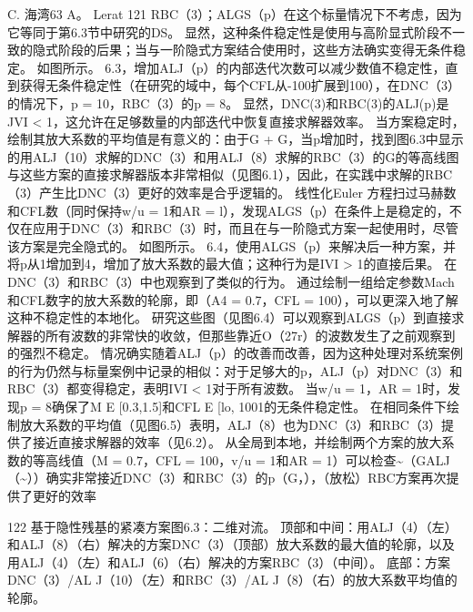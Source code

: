 \documentclass[UTF8,11pt,a4paper,openany,fontset=fandol]{ctexbook}
\begin{document}
C. 海湾63 A。 Lerat 121 RBC（3）；ALGS（p）在这个标量情况下不考虑，因为它等同于第6.3节中研究的DS。 显然，这种条件稳定性是使用与高阶显式阶段不一致的隐式阶段的后果；当与一阶隐式方案结合使用时，这些方法确实变得无条件稳定。 如图所示。 6.3，增加ALJ（p）的内部迭代次数可以减少数值不稳定性，直到获得无条件稳定性（在研究的域中，每个CFL从-100扩展到100），在DNC（3）的情况下，p = 10，RBC（3）的p = 8。 显然，DNC(3)和RBC(3)的ALJ(p)是JVI < 1，这允许在足够数量的内部迭代中恢复直接求解器效率。 当方案稳定时，绘制其放大系数的平均值是有意义的：由于G + G，当p增加时，找到图6.3中显示的用ALJ（10）求解的DNC（3）和用ALJ（8）求解的RBC（3）的G的等高线图与这些方案的直接求解器版本非常相似（见图6.1），因此，在实践中求解的RBC（3）产生比DNC（3）更好的效率是合乎逻辑的。 线性化Euler 方程扫过马赫数和CFL数（同时保持w/u = 1和AR = l），发现ALGS（p）在条件上是稳定的，不仅在应用于DNC（3）和RBC（3）时，而且在与一阶隐式方案一起使用时，尽管该方案是完全隐式的。 如图所示。 6.4，使用ALGS（p）来解决后一种方案，并将p从1增加到4，增加了放大系数的最大值；这种行为是IVI > 1的直接后果。 在DNC（3）和RBC（3）中也观察到了类似的行为。 通过绘制一组给定参数Mach和CFL数字的放大系数的轮廓，即（A4 = 0.7，CFL = 100），可以更深入地了解这种不稳定性的本地化。 研究这些图（见图6.4）可以观察到ALGS（p）到直接求解器的所有波数的非常快的收敛，但那些靠近O（27r）的波数发生了之前观察到的强烈不稳定。 情况确实随着ALJ（p）的改善而改善，因为这种处理对系统案例的行为仍然与标量案例中记录的相似：对于足够大的p，ALJ（p）对DNC（3）和RBC（3）都变得稳定，表明IVI < 1对于所有波数。 当w/u = 1，AR = 1时，发现p = 8确保了M E [0.3,1.5]和CFL E [lo, 1001的无条件稳定性。 在相同条件下绘制放大系数的平均值（见图6.5）表明，ALJ（8）也为DNC（3）和RBC（3）提供了接近直接求解器的效率（见6.2）。 从全局到本地，并绘制两个方案的放大系数的等高线值（M = 0.7，CFL = 100，v/u = 1和AR = 1）可以检查\textasciitilde{}（GALJ（\textasciitilde{}））确实非常接近DNC（3）和RBC（3）的p（G，），（放松）RBC方案再次提供了更好的效率

122 基于隐性残基的紧凑方案图6.3：二维对流。 顶部和中间：用ALJ（4）（左）和ALJ（8）（右）解决的方案DNC（3）（顶部）放大系数的最大值的轮廓，以及用ALJ（4）（左）和ALJ（6）（右）解决的方案RBC（3）（中间）。 底部：方案DNC（3）/AL J（10）（左）和RBC（3）/AL J（8）（右）的放大系数平均值的轮廓。
\end{document}
